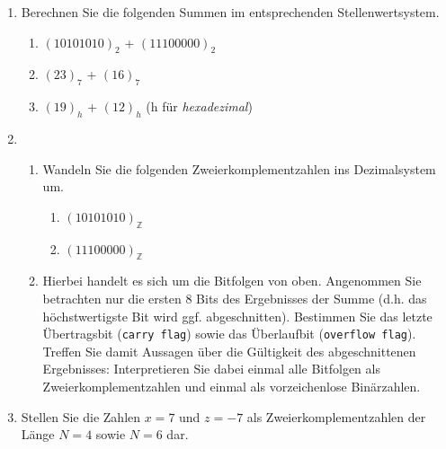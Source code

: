 \begin{enumerate}
	\item Berechnen Sie die folgenden Summen im entsprechenden Stellenwertsystem.
		\begin{enumerate}
			\item  $(10101010)_2$ + $(11100000)_2$
			\item $(23)_7$ + $(16)_7$
			\item $(19)_{h}$ + $(12)_{h}$ (h für \textit{hexadezimal})
		\end{enumerate}
	\item 
	\begin{enumerate}
		\item Wandeln Sie die folgenden Zweierkomplementzahlen ins Dezimalsystem um.
		\begin{enumerate}
			\item $(10101010)_{\mathbb{Z}}$
			\item $(11100000)_{\mathbb{Z}}$
		\end{enumerate}
		\item Hierbei handelt es sich um die Bitfolgen von oben. Angenommen Sie betrachten nur die ersten 8 Bits des Ergebnisses der Summe (d.h. das höchstwertigste Bit wird ggf. abgeschnitten). Bestimmen Sie das letzte Übertragsbit (\texttt{carry flag}) sowie das Überlaufbit (\texttt{overflow flag}).  Treffen Sie damit Aussagen über die Gültigkeit des abgeschnittenen Ergebnisses: Interpretieren Sie dabei einmal alle Bitfolgen als Zweierkomplementzahlen und einmal als vorzeichenlose Binärzahlen.
	\end{enumerate}
	\item Stellen Sie die Zahlen $x = 7$ und $z = -7$ als Zweierkomplementzahlen der Länge $N = 4$ sowie $N = 6$ dar.
\end{enumerate}

